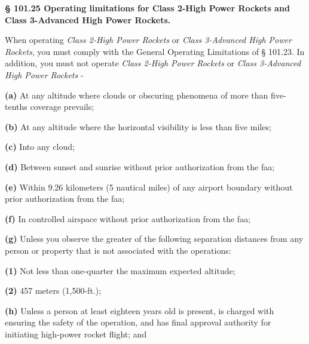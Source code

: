 \textbf{§ 101.25 Operating limitations for Class 2-High Power Rockets and Class 3-Advanced High Power Rockets.}\par

When operating \textit{Class 2-High Power Rockets} or \textit{Class 3-Advanced High Power Rockets}, you must comply with the General Operating Limitations of § 101.23. In addition, you must not operate \textit{Class 2-High Power Rockets} or \textit{Class 3-Advanced High Power Rockets} -\par

\textbf{(a)} At any altitude where clouds or obscuring phenomena of more than five-tenths coverage prevails;\par

\textbf{(b)} At any altitude where the horizontal visibility is less than five miles;\par

\textbf{(c)} Into any cloud;\par

\textbf{(d)} Between sunset and sunrise without prior authorization from the \gls{faa};\par

\textbf{(e)} Within 9.26 kilometers (5 nautical miles) of any airport boundary without prior authorization from the \gls{faa};\par

\textbf{(f)} In controlled airspace without prior authorization from the \gls{faa};\par

\textbf{(g)} Unless you observe the greater of the following separation distances from any person or property that is not associated with the operations:\par

\begin{adjustwidth}{0.5in}{0.0in}
\textbf{(1)} Not less than one-quarter the maximum expected altitude;\par

\end{adjustwidth}

\begin{adjustwidth}{0.5in}{0.0in}
\textbf{(2)} 457 meters (1,500-ft.);\par

\end{adjustwidth}

\textbf{(h)} Unless a person at least eighteen years old is present, is charged with ensuring the safety of the operation, and has final approval authority for initiating high-power rocket flight; and\par

